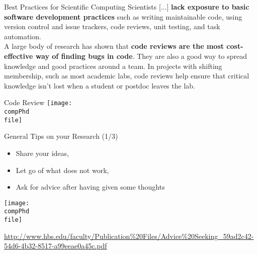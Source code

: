 \documentclass[]{beamer} %
\def\pathbase{/Users/pmxal9/} 	%
\def\pathbase{/Users/pmaal/} 	%
\edef\drop{\pathbase Dropbox/}		%
\edef\compPhd{\drop Nottingham/repos/phd/Seminars/+MatlabComputationalPhD/}
\begin{document}
\begin{frame}{Best Practices for Scientific Computing}
Scientists [...]  \textbf{lack exposure to basic 
software development practices} such as writing maintainable code, 
using version control and issue trackers, code reviews, unit testing, and task automation.\\[3mm]

A large body of research has shown that \textbf{code reviews are the most cost-effective way of finding bugs in code}. 
They are also a good way to spread knowledge and good practices around a team. In projects with shifting membership, 
such as most academic labs, code reviews help ensure that critical knowledge isn't lost when a student or postdoc leaves the lab.\\[3mm]
\end{frame}


\begin{frame}{Code Review}\centering
\def\file{xkcd/code_quality}
\texttt{[image: \\compPhd \\file]}
\end{frame}


\begin{frame}{General Tips on your Research (1/3)}
\begin{itemize}
\item Share your ideas, 
\item Let go of what does not work, 
\item Ask for advice after having given some thoughts
\end{itemize}
\def\file{intro/smartpeople}
\begin{center}\texttt{[image: \\compPhd \\file]}\end{center}
{\tiny{\url{http://www.hbs.edu/faculty/Publication\%20Files/Advice\%20Seeking_59ad2c42-54d6-4b32-8517-a99eeae0a45c.pdf}}}
\end{frame}
\end{document}
